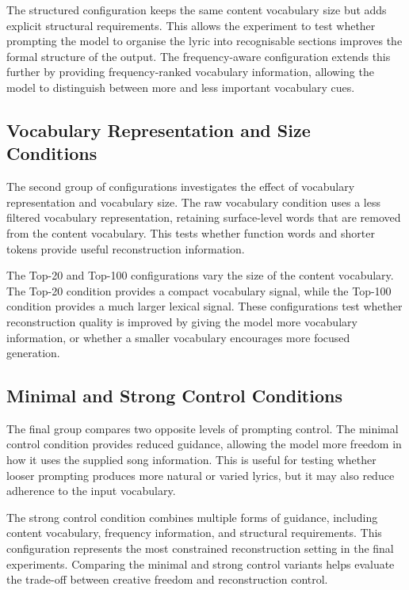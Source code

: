 The structured configuration keeps the same content vocabulary size but adds explicit structural requirements. This allows the experiment to test whether prompting the model to organise the lyric into recognisable sections improves the formal structure of the output. The frequency-aware configuration extends this further by providing frequency-ranked vocabulary information, allowing the model to distinguish between more and less important vocabulary cues.

\subsection{Vocabulary Representation and Size Conditions}

The second group of configurations investigates the effect of vocabulary representation and vocabulary size. The raw vocabulary condition uses a less filtered vocabulary representation, retaining surface-level words that are removed from the content vocabulary. This tests whether function words and shorter tokens provide useful reconstruction information.

The Top-20 and Top-100 configurations vary the size of the content vocabulary. The Top-20 condition provides a compact vocabulary signal, while the Top-100 condition provides a much larger lexical signal. These configurations test whether reconstruction quality is improved by giving the model more vocabulary information, or whether a smaller vocabulary encourages more focused generation.

\subsection{Minimal and Strong Control Conditions}

The final group compares two opposite levels of prompting control. The minimal control condition provides reduced guidance, allowing the model more freedom in how it uses the supplied song information. This is useful for testing whether looser prompting produces more natural or varied lyrics, but it may also reduce adherence to the input vocabulary.

The strong control condition combines multiple forms of guidance, including content vocabulary, frequency information, and structural requirements. This configuration represents the most constrained reconstruction setting in the final experiments. Comparing the minimal and strong control variants helps evaluate the trade-off between creative freedom and reconstruction control.


